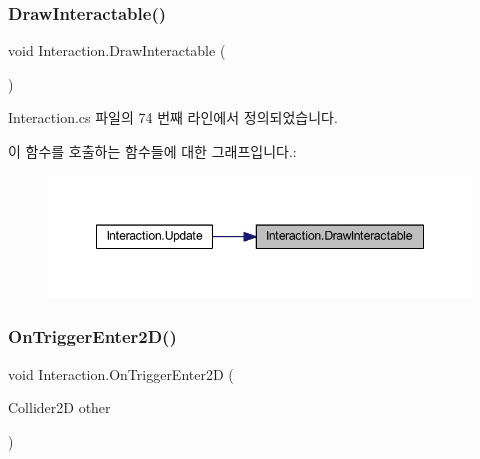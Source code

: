 \mbox{\label{class_interaction_a99a346f8b614166a70976db9c7829d83}} 
\subsubsection{\texorpdfstring{DrawInteractable()}{DrawInteractable()}}
{\footnotesize\ttfamily void Interaction.\+Draw\+Interactable (\begin{DoxyParamCaption}{ }\end{DoxyParamCaption})\hspace{0.3cm}{\ttfamily [private]}}



Interaction.\+cs 파일의 74 번째 라인에서 정의되었습니다.


\begin{DoxyCode}{0}

\end{DoxyCode}
이 함수를 호출하는 함수들에 대한 그래프입니다.\+:\nopagebreak
\begin{figure}[H]
\begin{center}
\leavevmode
\includegraphics[width=348pt]{d3/d8e/class_interaction_a99a346f8b614166a70976db9c7829d83_icgraph}
\end{center}
\end{figure}
\mbox{\label{class_interaction_ac6a15155873618a49f8762db31645e9a}} 
\subsubsection{\texorpdfstring{OnTriggerEnter2D()}{OnTriggerEnter2D()}}
{\footnotesize\ttfamily void Interaction.\+On\+Trigger\+Enter2D (\begin{DoxyParamCaption}\item[{Collider2D}]{other }\end{DoxyParamCaption})\hspace{0.3cm}{\ttfamily [private]}}



